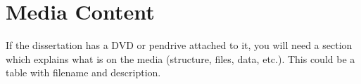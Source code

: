 \chapter{Media Content}

If the dissertation has a DVD or pendrive attached to it, you will need a section which explains what is on the media (structure, files, data, etc.).
This could be a table with filename and description.

\blindtext
